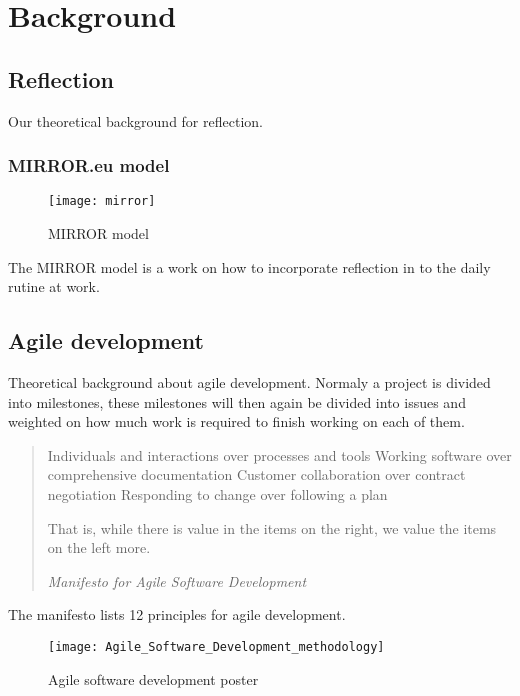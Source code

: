 \chapter{Background}

\section{Reflection}
Our theoretical background for reflection.
\subsection{MIRROR.eu model}

\begin{figure}[h!]
\label{logo}
\centering
	\texttt{[image: mirror]}
\caption{MIRROR model}
\end{figure}
The MIRROR model is a work on how to incorporate reflection in to the daily rutine at work.


\section{Agile development}
Theoretical background about agile development. Normaly a project is divided into milestones, these milestones will then again be divided into issues and weighted on how much work is required to finish working on each of them.

\begin{quotation}
Individuals and interactions over processes and tools
Working software over comprehensive documentation
Customer collaboration over contract negotiation
Responding to change over following a plan

That is, while there is value in the items on
the right, we value the items on the left more.

\em Manifesto for Agile Software Development
\end{quotation}

The manifesto lists 12 principles for agile development.
\begin{figure}[h!]
\label{logo}
\centering
	\texttt{[image: Agile\_Software\_Development\_methodology]}
\caption{Agile software development poster}
\end{figure}

